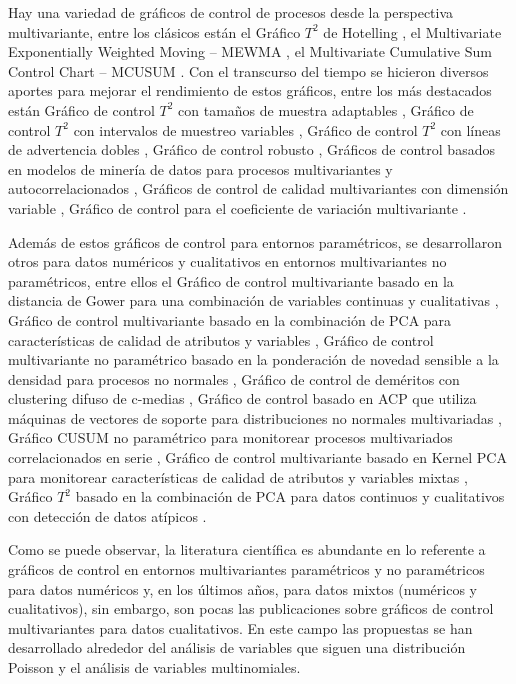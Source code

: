 \documentclass[mathematics,article,submit,moreauthors,pdftex]{mdpi}
\begin{document}
Hay una variedad de gráficos de control de procesos desde la perspectiva
multivariante, entre los clásicos están el Gráfico \(T^2\) de Hotelling
\citep{hotelling1947}, el Multivariate Exponentially Weighted Moving --
MEWMA \citep{lowry1992}, el Multivariate Cumulative Sum Control Chart --
MCUSUM \citep{Crosier1988}. Con el transcurso del tiempo se hicieron
diversos aportes para mejorar el rendimiento de estos gráficos, entre
los más destacados están Gráfico de control \(T^2\) con tamaños de
muestra adaptables \citep{Aparisi1996}, Gráfico de control \(T^2\) con
intervalos de muestreo variables \citep{Aparisi2001}, Gráfico de control
\(T^2\) con líneas de advertencia dobles \citep{Faraz2006}, Gráfico de
control robusto \citep{shabbak2012}, Gráficos de control basados en
modelos de minería de datos para procesos multivariantes y
autocorrelacionados \citep{kim2012}, Gráficos de control de calidad
multivariantes con dimensión variable \citep{ruiz2013}, Gráfico de
control para el coeficiente de variación multivariante
\citep{yeong2016}.

Además de estos gráficos de control para entornos paramétricos, se
desarrollaron otros para datos numéricos y cualitativos en entornos
multivariantes no paramétricos, entre ellos el Gráfico de control
multivariante basado en la distancia de Gower para una combinación de
variables continuas y cualitativas \citep{Tuerhong2014}, Gráfico de
control multivariante basado en la combinación de PCA para
características de calidad de atributos y variables
\citep{Muhammad2018}, Gráfico de control multivariante no paramétrico
basado en la ponderación de novedad sensible a la densidad para procesos
no normales \citep{liu2020}, Gráfico de control de deméritos con
clustering difuso de c-medias \citep{yilmaz2020}, Gráfico de control
basado en ACP que utiliza máquinas de vectores de soporte para
distribuciones no normales multivariadas \citep{Farokhnia}, Gráfico
CUSUM no paramétrico para monitorear procesos multivariados
correlacionados en serie \citep{xue2020}, Gráfico de control
multivariante basado en Kernel PCA para monitorear características de
calidad de atributos y variables mixtas \citep{Ahsan2020}, Gráfico
\(T^2\) basado en la combinación de PCA para datos continuos y
cualitativos con detección de datos atípicos \citep{Ahsan2021}.

Como se puede observar, la literatura científica es abundante en lo
referente a gráficos de control en entornos multivariantes paramétricos
y no paramétricos para datos numéricos y, en los últimos años, para
datos mixtos (numéricos y cualitativos), sin embargo, son pocas las
publicaciones sobre gráficos de control multivariantes para datos
cualitativos. En este campo las propuestas se han desarrollado alrededor
del análisis de variables que siguen una distribución Poisson y el
análisis de variables multinomiales.
\end{document}
